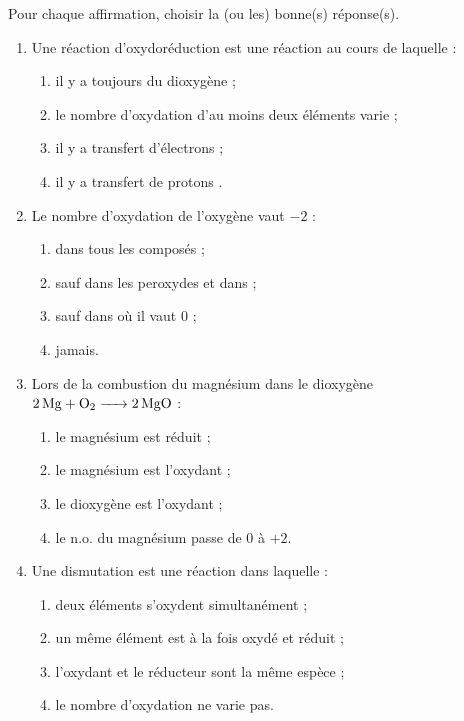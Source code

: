 \documentclass[11pt]{article}
\begin{document}
\begin{exercice}
Pour chaque affirmation, choisir la (ou les) bonne(s) réponse(s).
\begin{enumerate}
\item Une réaction d'oxydoréduction est une réaction au cours de laquelle :
\begin{enumerate}
\item il y a toujours du dioxygène ;
\item le nombre d'oxydation d'au moins deux éléments varie ;
\item il y a transfert d'électrons ;
\item il y a transfert de protons .
\end{enumerate}
\item Le nombre d'oxydation de l'oxygène vaut $-2$ :
\begin{enumerate}
\item dans tous les composés ;
\item sauf dans les peroxydes et dans  ;
\item sauf dans  où il vaut $0$ ;
\item jamais.
\end{enumerate}
\item Lors de la combustion du magnésium dans le dioxygène $\ce{2 Mg + O2 -> 2 MgO}$ :
\begin{enumerate}
\item le magnésium est réduit ;
\item le magnésium est l'oxydant ;
\item le dioxygène est l'oxydant ;
\item le n.o. du magnésium passe de $0$ à $+2$.
\end{enumerate}
\item Une dismutation est une réaction dans laquelle :
\begin{enumerate}
\item deux éléments s'oxydent simultanément ;
\item un même élément est à la fois oxydé et réduit ;
\item l'oxydant et le réducteur sont la même espèce ;
\item le nombre d'oxydation ne varie pas.
\end{enumerate}
\end{enumerate}
\end{exercice}
\end{document}

